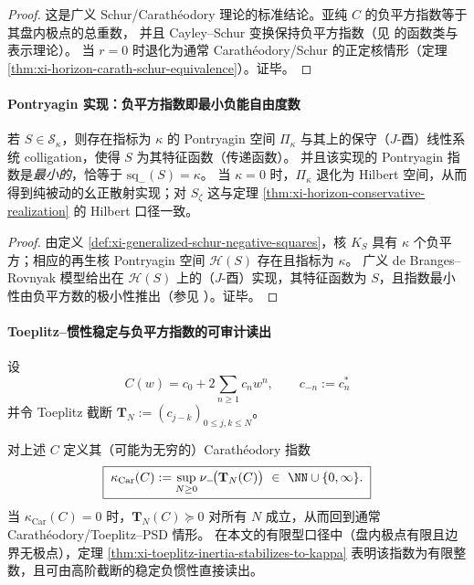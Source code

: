 \begin{proof}
这是广义 Schur/Carath\'eodory 理论的标准结论。亚纯 \(C\) 的负平方指数等于其盘内极点的总重数，
并且 Cayley--Schur 变换保持负平方指数（见 \cite{KreinLanger1977ExtensionPiKappaI,AlpayDijksmaRovnyakDeSnoo1997SchurPontryagin} 的函数类与表示理论）。
当 \(r=0\) 时退化为通常 Carath\'eodory/Schur 的正定核情形（定理 \ref{thm:xi-horizon-carath-schur-equivalence}）。证毕。
\end{proof}

\paragraph{Pontryagin 实现：负平方指数即最小负能自由度数}
\begin{theorem}\label{thm:xi-minimal-pontryagin-conservative-realization}
若 \(S\in\mathcal{S}_{\kappa}\)，则存在指标为 \(\kappa\) 的 Pontryagin 空间 \(\Pi_{\kappa}\) 与其上的保守（\(J\)-酉）线性系统 colligation，使得 \(S\) 为其特征函数（传递函数）。
并且该实现的 Pontryagin 指数是\emph{最小的}，恰等于 \(\mathrm{sq}_-(S)=\kappa\)。
当 \(\kappa=0\) 时，\(\Pi_{\kappa}\) 退化为 Hilbert 空间，从而得到纯被动的幺正散射实现；对 \(S_{\zeta}\) 这与定理 \ref{thm:xi-horizon-conservative-realization} 的 Hilbert 口径一致。
\end{theorem}

\begin{proof}
由定义 \ref{def:xi-generalized-schur-negative-squares}，核 \(K_S\) 具有 \(\kappa\) 个负平方；相应的再生核 Pontryagin 空间 \(\mathcal{H}(S)\) 存在且指标为 \(\kappa\)。
广义 de Branges--Rovnyak 模型给出在 \(\mathcal{H}(S)\) 上的（\(J\)-酉）实现，其特征函数为 \(S\)，且指数最小性由负平方数的极小性推出（参见 \cite{AlpayDijksmaRovnyakDeSnoo1997SchurPontryagin}）。证毕。
\end{proof}

\paragraph{Toeplitz--惯性稳定与负平方指数的可审计读出}
设
\begin{equation}\label{eq:xi-generalized-carath-series}
\boxed{\;
C(w)=c_0+2\sum_{n\ge 1}c_n w^n,\qquad c_{-n}:=c_n^\ast\;}
\end{equation}
并令 Toeplitz 截断
\(
\mathbf{T}_N:=(c_{j-k})_{0\le j,k\le N}
\)。

\begin{definition}\label{def:xi-generalized-carath-index-toeplitz}
对上述 \(C\) 定义其（可能为无穷的）Carath\'eodory 指数
\begin{equation}\label{eq:xi-carath-index-toeplitz}
\boxed{\;
\kappa_{\mathrm{Car}}(C):=\sup_{N\ge 0}\nu_-\!\bigl(\mathbf{T}_N(C)\bigr)\ \in\ \NN\cup\{0,\infty\}.\;}
\end{equation}
当 \(\kappa_{\mathrm{Car}}(C)=0\) 时，\(\mathbf{T}_N(C)\succeq 0\) 对所有 \(N\) 成立，从而回到通常 Carath\'eodory/Toeplitz--PSD 情形。
在本文的有限型口径中（盘内极点有限且边界无极点），定理 \ref{thm:xi-toeplitz-inertia-stabilizes-to-kappa} 表明该指数为有限整数，且可由高阶截断的稳定负惯性直接读出。
\end{definition}

